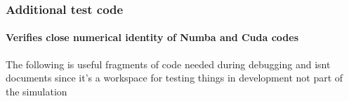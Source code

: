\documentclass[11pt]{article}
\begin{document}
    \hypertarget{additional-test-code}{%
\subsubsection{Additional test code}\label{additional-test-code}}

\hypertarget{verifies-close-numerical-identity-of-numba-and-cuda-codes}{%
\paragraph{Verifies close numerical identity of Numba and Cuda
codes}\label{verifies-close-numerical-identity-of-numba-and-cuda-codes}}

The following is useful fragments of code needed during debugging and
isnt documents since it's a workspace for testing things in development
not part of the simulation
\end{document}
